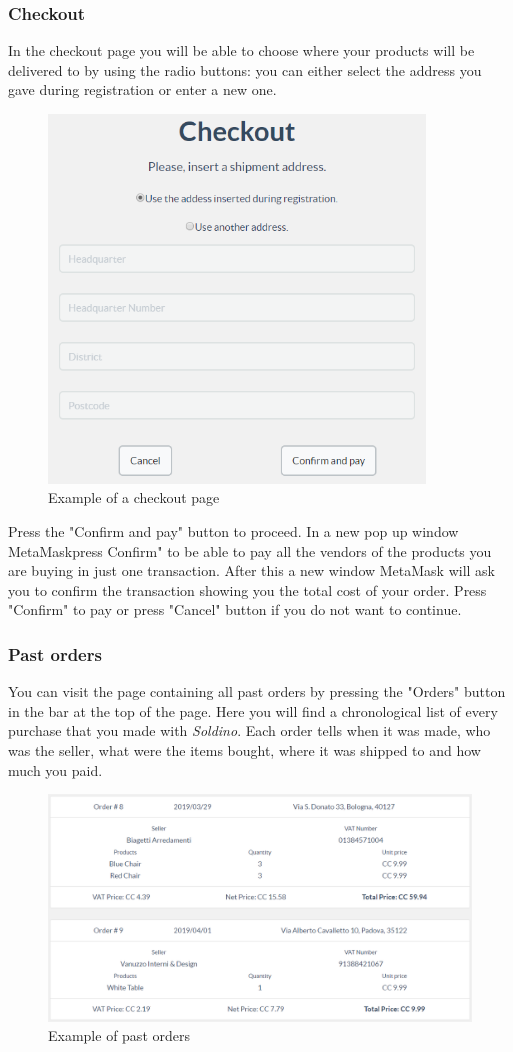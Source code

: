 		\subsubsection{Checkout}
		In the checkout page you will be able to choose where your products 
		will be delivered to by using the radio buttons: you can either select 
		the address you gave during registration or enter a new one.
	\begin{figure}[H]
		\includegraphics[width=10cm]{res/images/checkout.png}
		\centering
		\caption{Example of a checkout page}
	\end{figure}
	\noindent Press the "Confirm and pay" button to proceed. In a new 
	pop up window MetaMask\glosp press Confirm" to be able to pay all the 
	vendors of the products you are buying in just one transaction. After this 
	a new window MetaMask will ask you to confirm the transaction showing you 
	the total cost of your order. Press "Confirm" to pay or press "Cancel" 
	button if you do not want to continue.
		\subsubsection{Past orders}
		You can visit the page containing all past orders by pressing the 
		"Orders" button in the bar at the top of the page.
		Here you will find a chronological list of every purchase that you made 
		with \textit{Soldino}. Each order tells when it was made, who was the 
		seller, what were the items bought, where it was shipped to and how 
		much you paid.
		\begin{figure}[H]
			\includegraphics[width=15cm]{res/images/past_orders.png}
			\centering
			\caption{Example of past orders}
		\end{figure}
